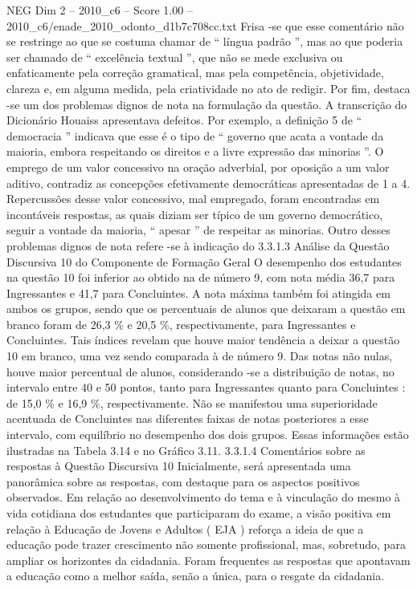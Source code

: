 \begin{textsample}{NEG Dim 2 – 2010\_c6 – Score 1.00 – 2010\_c6/enade\_2010\_odonto\_d1b7c708cc.txt}
Frisa -se que esse comentário não se restringe ao que se costuma chamar de “ língua padrão ”, mas ao que poderia ser chamado de “ excelência textual ”, que não se mede exclusiva ou enfaticamente pela correção gramatical, mas pela competência, objetividade, clareza e, em alguma medida, pela criatividade no ato de redigir.
Por fim, destaca -se um dos problemas dignos de nota na formulação da questão.
A transcrição do Dicionário Houaiss apresentava defeitos.
Por exemplo, a definição 5 de “ democracia ” indicava que esse é o tipo de “ governo que acata a vontade da maioria, embora respeitando os direitos e a livre expressão das minorias ”.
O emprego de um valor concessivo na oração adverbial, por oposição a um valor aditivo, contradiz as concepções efetivamente democráticas apresentadas de 1 a 4.
Repercussões desse valor concessivo, mal empregado, foram encontradas em incontáveis respostas, as quais diziam ser típico de um governo democrático, seguir a vontade da maioria, “ apesar ” de respeitar as minorias.
Outro desses problemas dignos de nota refere -se à indicação do 3.3.1.3 Análise da Questão Discursiva 10 do Componente de Formação Geral O desempenho dos estudantes na questão 10 foi inferior ao obtido na de número 9, com nota média 36,7 para Ingressantes e 41,7 para Concluintes.
A nota máxima também foi atingida em ambos os grupos, sendo que os percentuais de alunos que deixaram a questão em branco foram de 26,3 \% e 20,5 \%, respectivamente, para Ingressantes e Concluintes.
Tais índices revelam que houve maior tendência a deixar a questão 10 em branco, uma vez sendo comparada à de número 9.
Das notas não nulas, houve maior percentual de alunos, considerando -se a distribuição de notas, no intervalo entre 40 e 50 pontos, tanto para Ingressantes quanto para Concluintes : de 15,0 \% e 16,9 \%, respectivamente.
Não se manifestou uma superioridade acentuada de Concluintes nas diferentes faixas de notas posteriores a esse intervalo, com equilíbrio no desempenho dos dois grupos.
Essas informações estão ilustradas na Tabela 3.14 e no Gráfico 3.11. 3.3.1.4 Comentários sobre as respostas à Questão Discursiva 10 Inicialmente, será apresentada uma panorâmica sobre as respostas, com destaque para os aspectos positivos observados.
Em relação ao desenvolvimento do tema e à vinculação do mesmo à vida cotidiana dos estudantes que participaram do exame, a visão positiva em relação à Educação de Jovens e Adultos ( EJA ) reforça a ideia de que a educação pode trazer crescimento não somente profissional, mas, sobretudo, para ampliar os horizontes da cidadania.
Foram frequentes as respostas que apontavam a educação como a melhor saída, senão a única, para o resgate da cidadania.

\end{textsample}
